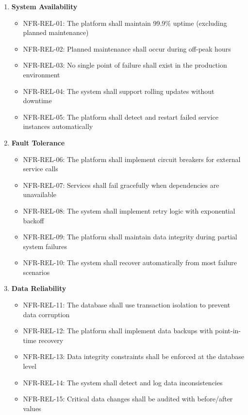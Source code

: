 \begin{enumerate}
   \item \textbf{System Availability}
   \begin{itemize}
      \item NFR-REL-01: The platform shall maintain 99.9\% uptime (excluding planned maintenance)
      \item NFR-REL-02: Planned maintenance shall occur during off-peak hours
      \item NFR-REL-03: No single point of failure shall exist in the production environment
      \item NFR-REL-04: The system shall support rolling updates without downtime
      \item NFR-REL-05: The platform shall detect and restart failed service instances automatically
   \end{itemize}

   \item \textbf{Fault Tolerance}
   \begin{itemize}
      \item NFR-REL-06: The platform shall implement circuit breakers for external service calls
      \item NFR-REL-07: Services shall fail gracefully when dependencies are unavailable
      \item NFR-REL-08: The system shall implement retry logic with exponential backoff
      \item NFR-REL-09: The platform shall maintain data integrity during partial system failures
      \item NFR-REL-10: The system shall recover automatically from most failure scenarios
   \end{itemize}

   \item \textbf{Data Reliability}
   \begin{itemize}
      \item NFR-REL-11: The database shall use transaction isolation to prevent data corruption
      \item NFR-REL-12: The platform shall implement data backups with point-in-time recovery
      \item NFR-REL-13: Data integrity constraints shall be enforced at the database level
      \item NFR-REL-14: The system shall detect and log data inconsistencies
      \item NFR-REL-15: Critical data changes shall be audited with before/after values
   \end{itemize}


\end{enumerate}
